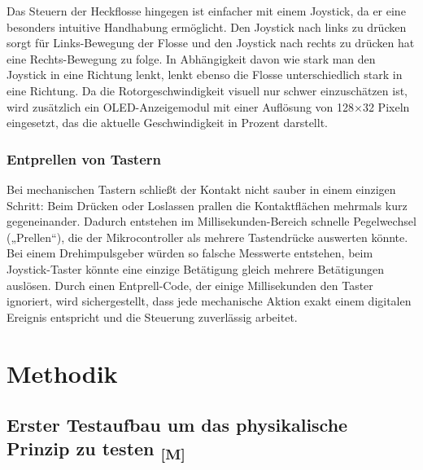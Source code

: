 \documentclass[a4paper,12pt]{article}
\begin{document}
Das Steuern der Heckflosse hingegen ist einfacher mit einem Joystick, da er eine besonders intuitive Handhabung ermöglicht. Den Joystick nach links zu drücken sorgt für Links-Bewegung der Flosse und den Joystick nach rechts zu drücken hat eine Rechts-Bewegung zu folge. In Abhängigkeit davon wie stark man den Joystick in eine Richtung lenkt, lenkt ebenso die Flosse unterschiedlich stark in eine Richtung. \newline
Da die Rotorgeschwindigkeit visuell nur schwer einzuschätzen ist, wird zusätzlich ein OLED-Anzeigemodul mit einer Auflösung von 128×32 Pixeln eingesetzt, das die aktuelle Geschwindigkeit in Prozent darstellt.


\subsubsection{Entprellen von Tastern}

Bei mechanischen Tastern schließt der Kontakt nicht sauber in einem einzigen Schritt: Beim Drücken oder Loslassen prallen die Kontaktflächen mehrmals kurz gegeneinander. Dadurch entstehen im Millisekunden-Bereich schnelle Pegelwechsel („Prellen“), die der Mikrocontroller als mehrere Tastendrücke auswerten könnte. Bei einem Drehimpulsgeber würden so falsche Messwerte entstehen, beim Joystick-Taster könnte eine einzige Betätigung gleich mehrere Betätigungen auslösen. Durch einen Entprell-Code, der einige Millisekunden den Taster ignoriert, wird sichergestellt, dass jede mechanische Aktion exakt einem digitalen Ereignis entspricht und die Steuerung zuverlässig arbeitet.

\newpage
\section{Methodik}


\subsection{\texorpdfstring{Erster Testaufbau um das physikalische Prinzip zu testen \textsubscript{[M]}}{Erster Testaufbau um das physikalische Prinzip zu testen [M]}}
\end{document}
